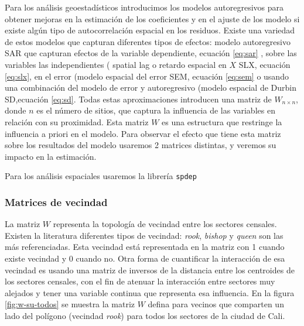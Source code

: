 \documentclass[12pt,]{book}
\begin{document}
Para los análisis geoestadísticos introducimos los modelos
autoregresivos para obtener mejoras en la estimación de los coeficientes
y en el ajuste de los modelo si existe algún tipo de autocorrelación
espacial en los residuos. Existe una variedad de estos modelos que
capturan diferentes tipos de efectos: modelo autoregresivo SAR que
capturan efectos de la variable dependiente, ecuación \eqref{eq:sar} ,
sobre las variables las independientes ( spatial lag o retardo espacial
en \(X\) SLX, ecuación \eqref{eq:slx}, en el error (modelo espacial del
error SEM, ecuación \eqref{eq:sem} o usando una combinación del modelo de
error y autoregresivo (modelo espacial de Durbin SD,ecuación
\eqref{eq:sd}. Todas estas aproximaciones introducen una matriz de
\(W_{n \times n}\), donde \(n\) es el número de sitios, que captura la
influencia de las variables en relación con su proximidad. Esta matriz
\(W\) es una estructura que restringe la influencia a priori en el
modelo. Para observar el efecto que tiene esta matriz sobre los
resultados del modelo usaremos 2 matrices distintas, y veremos su
impacto en la estimación.

Para los análisis espaciales usaremos la librería \texttt{spdep}
\citep{R-spdep}

\subsubsection{Matrices de vecindad}\label{matrices-de-vecindad}

La matriz \(W\) representa la topología de vecindad entre los sectores
censales. Existen la literatura diferentes tipos de vecindad:
\emph{rook}, \emph{bishop} y \emph{queen} son las más referenciadas.
Esta vecindad está representada en la matriz con 1 cuando existe
vecindad y 0 cuando no. Otra forma de cuantificar la interacción de esa
vecindad es usando una matriz de inversos de la distancia entre los
centroides de los sectores censales, con el fin de atenuar la
interacción entre sectores muy alejados y tener una variable continua
que representa esa influencia. En la figura \ref{fig:w-su-todos} se
muestra la matriz \(W\) defina para vecinos que comparten un lado del
polígono (vecindad \emph{rook}) para todos los sectores de la ciudad de
Cali.
\end{document}
